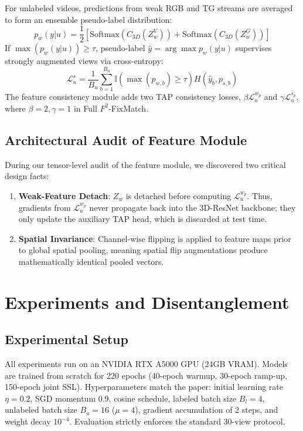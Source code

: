\documentclass[10pt,twocolumn,a4paper]{article}
\begin{document}
For unlabeled videos, predictions from weak RGB and TG streams are averaged to form an ensemble pseudo-label distribution:
\begin{equation}
    p_w(y|u) = \frac{1}{2}\left[\text{Softmax}(C_{3D}(Z_w^V)) + \text{Softmax}(C_{3D}(Z_w^G))\right]
\end{equation}
If $\max(p_w(y|u)) \ge \tau$, pseudo-label $\hat{y} = \arg\max p_w(y|u)$ supervises strongly augmented views via cross-entropy:
\begin{equation}
    \mathcal{L}_u^s = \frac{1}{B_u} \sum_{b=1}^{B_u} \mathbb{I}(\max(p_{w,b}) \ge \tau) H(\hat{y}_b, p_{s,b})
\end{equation}
The feature consistency module adds two TAP consistency losses, $\beta \mathcal{L}_u^{w_p}$ and $\gamma \mathcal{L}_u^{s_p}$, where $\beta=2, \gamma=1$ in Full $F^2$-FixMatch.

\subsection{Architectural Audit of Feature Module}
During our tensor-level audit of the feature module, we discovered two critical design facts:
\begin{enumerate}
    \item \textbf{Weak-Feature Detach}: $Z_w$ is detached before computing $\mathcal{L}_u^{w_p}$. Thus, gradients from $\mathcal{L}_u^{w_p}$ never propagate back into the 3D-ResNet backbone; they only update the auxiliary TAP head, which is discarded at test time.
    \item \textbf{Spatial Invariance}: Channel-wise flipping is applied to feature maps prior to global spatial pooling, meaning spatial flip augmentations produce mathematically identical pooled vectors.
\end{enumerate}

\section{Experiments and Disentanglement}
\label{sec:experiments}

\subsection{Experimental Setup}
All experiments run on an NVIDIA RTX A5000 GPU (24GB VRAM). Models are trained from scratch for 220 epochs (40-epoch warmup, 30-epoch ramp-up, 150-epoch joint SSL). Hyperparameters match the paper: initial learning rate $\eta=0.2$, SGD momentum 0.9, cosine schedule, labeled batch size $B_l=4$, unlabeled batch size $B_u=16$ ($\mu=4$), gradient accumulation of 2 steps, and weight decay $10^{-4}$. Evaluation strictly enforces the standard 30-view protocol.
\end{document}
